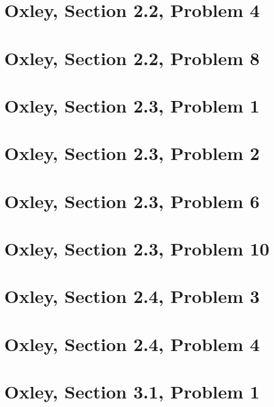     \section{Oxley, Section 2.2, Problem 4}
        
        \clearpage

    \section{Oxley, Section 2.2, Problem 8}
        
        \clearpage

    \section{Oxley, Section 2.3, Problem 1}
        
        \clearpage

    \section{Oxley, Section 2.3, Problem 2}
        
        \clearpage

    \section{Oxley, Section 2.3, Problem 6}
        
        \clearpage

    \section{Oxley, Section 2.3, Problem 10}
        
        \clearpage

    \section{Oxley, Section 2.4, Problem 3}
        
        \clearpage

    \section{Oxley, Section 2.4, Problem 4}
        
        \clearpage

    \section{Oxley, Section 3.1, Problem 1}
        
        \clearpage

